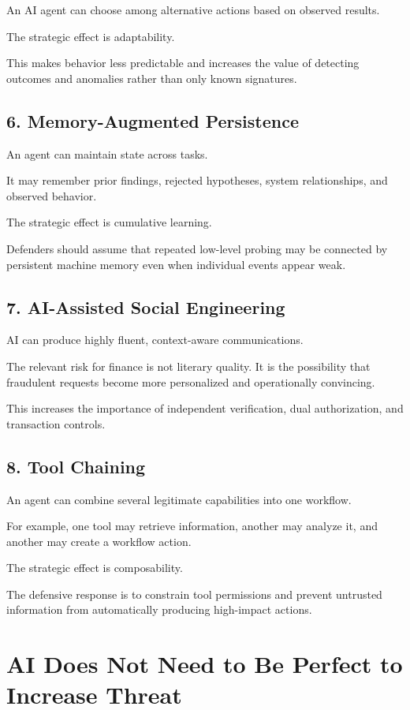 An AI agent can choose among alternative actions based on observed results.

The strategic effect is adaptability.

This makes behavior less predictable and increases the value of detecting outcomes and anomalies rather than only known signatures.

\subsection{6. Memory-Augmented Persistence}

An agent can maintain state across tasks.

It may remember prior findings, rejected hypotheses, system relationships, and observed behavior.

The strategic effect is cumulative learning.

Defenders should assume that repeated low-level probing may be connected by persistent machine memory even when individual events appear weak.

\subsection{7. AI-Assisted Social Engineering}

AI can produce highly fluent, context-aware communications.

The relevant risk for finance is not literary quality. It is the possibility that fraudulent requests become more personalized and operationally convincing.

This increases the importance of independent verification, dual authorization, and transaction controls.

\subsection{8. Tool Chaining}

An agent can combine several legitimate capabilities into one workflow.

For example, one tool may retrieve information, another may analyze it, and another may create a workflow action.

The strategic effect is composability.

The defensive response is to constrain tool permissions and prevent untrusted information from automatically producing high-impact actions.

\section{AI Does Not Need to Be Perfect to Increase Threat}

